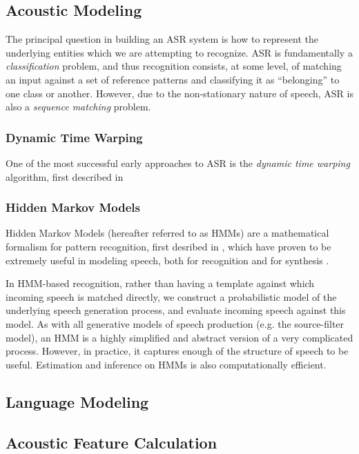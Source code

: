 \documentclass{article}
\begin{document}
\subsection{Acoustic Modeling}
\label{sec:am}

The principal question in building an ASR system is how to represent
the underlying entities which we are attempting to recognize.  ASR is
fundamentally a {\em classification} problem, and thus recognition
consists, at some level, of matching an input against a set of
reference patterns and classifying it as ``belonging'' to one class or
another.  However, due to the non-stationary nature of speech, ASR is
also a {\em sequence matching} problem.

\subsubsection{Dynamic Time Warping}
\label{sec:dtw}

One of the most successful early approaches to ASR is the {\em dynamic
  time warping} algorithm, first described in \cite{itakura1975}

\subsubsection{Hidden Markov Models}
\label{sec:hmm}

Hidden Markov Models (hereafter referred to as HMMs) are a
mathematical formalism for pattern recognition, first desribed in
\cite{baum1966}, which have proven to be extremely useful in modeling
speech, both for recognition \cite{rabiner1989} and for synthesis
\cite{masuko1996}.

In HMM-based recognition, rather than having a template against which
incoming speech is matched directly, we construct a probabilistic
model of the underlying speech generation process, and evaluate
incoming speech against this model.  As with all generative models of
speech production (e.g. the source-filter model), an HMM is a highly
simplified and abstract version of a very complicated process.
However, in practice, it captures enough of the structure of speech to
be useful.  Estimation and inference on HMMs is also computationally
efficient.

\subsection{Language Modeling}
\label{sec:ngrams}

\subsection{Acoustic Feature Calculation}
\label{sec:fe}
\end{document}
